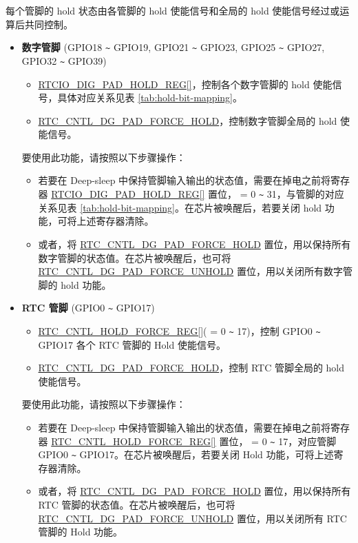 \documentclass[main\_\_CN.tex]{subfiles}
\begin{document}
每个管脚的 hold 状态由各管脚的 hold 使能信号和全局的 hold 使能信号经过或运算后共同控制。

\begin{itemize}
    \item \textbf{数字管脚} (GPIO18 \verb+~+ GPIO19, GPIO21 \verb+~+ GPIO23, GPIO25 \verb+~+ GPIO27, GPIO32 \verb+~+ GPIO39)
    \begin{itemize}
        \item \hyperref[regdesc:RTCIODIGPADHOLDREG] {RTCIO\_DIG\_PAD\_HOLD\_REG[]}，控制各个数字管脚的 hold 使能信号，具体对应关系见表 \ref{tab:hold-bit-mapping}。
        \item \hyperref[regdesc:RTCCNTLDIGISOREG]{RTC\_CNTL\_DG\_PAD\_FORCE\_HOLD}，控制数字管脚全局的 hold 使能信号。
    \end{itemize}
要使用此功能，请按照以下步骤操作：
    \begin{itemize}
        \item 若要在 Deep-sleep 中保持管脚输入输出的状态值，需要在掉电之前将寄存器 \hyperref[regdesc:RTCIODIGPADHOLDREG] {RTCIO\_DIG\_PAD\_HOLD\_REG[]} 置位， = 0 \verb+~+ 31，与管脚的对应关系见表 \ref{tab:hold-bit-mapping}。在芯片被唤醒后，若要关闭 hold 功能，可将上述寄存器清除。
        \item 或者，将 \hyperref[regdesc:RTCCNTLDIGISOREG]{RTC\_CNTL\_DG\_PAD\_FORCE\_HOLD} 置位，用以保持所有数字管脚的状态值。在芯片被唤醒后，也可将 \hyperref[regdesc:RTCCNTLDIGISOREG]{RTC\_CNTL\_DG\_PAD\_FORCE\_UNHOLD} 置位，用以关闭所有数字管脚的 hold 功能。
    \end{itemize}
    \item \textbf{RTC 管脚} (GPIO0 \verb+~+ GPIO17)
    \begin{itemize}
        \item \hyperref[regdesc:RTCCNTLHOLDFORCEREG]{RTC\_CNTL\_HOLD\_FORCE\_REG[]}( = 0 \verb+~+ 17)，控制 GPIO0 \verb+~+ GPIO17 各个 RTC 管脚的 Hold 使能信号。
        \item \hyperref[regdesc:RTCCNTLDIGISOREG]{RTC\_CNTL\_DG\_PAD\_FORCE\_HOLD}，控制 RTC 管脚全局的 hold 使能信号。
    \end{itemize}
    
要使用此功能，请按照以下步骤操作：

    \begin{itemize}
        \item 若要在 Deep-sleep 中保持管脚输入输出的状态值，需要在掉电之前将寄存器 \hyperref[regdesc:RTCCNTLHOLDFORCEREG]{RTC\_CNTL\_HOLD\_FORCE\_REG[]} 置位， = 0 \verb+~+ 17，对应管脚 GPIO0 \verb+~+ GPIO17。在芯片被唤醒后，若要关闭 Hold 功能，可将上述寄存器清除。 
        \item 或者，将 \hyperref[regdesc:RTCCNTLDIGISOREG]{RTC\_CNTL\_DG\_PAD\_FORCE\_HOLD} 置位，用以保持所有 RTC 管脚的状态值。在芯片被唤醒后，也可将 \hyperref[regdesc:RTCCNTLDIGISOREG]{RTC\_CNTL\_DG\_PAD\_FORCE\_UNHOLD} 置位，用以关闭所有 RTC 管脚的 Hold 功能。
    \end{itemize}
\end{itemize}
\end{document}
